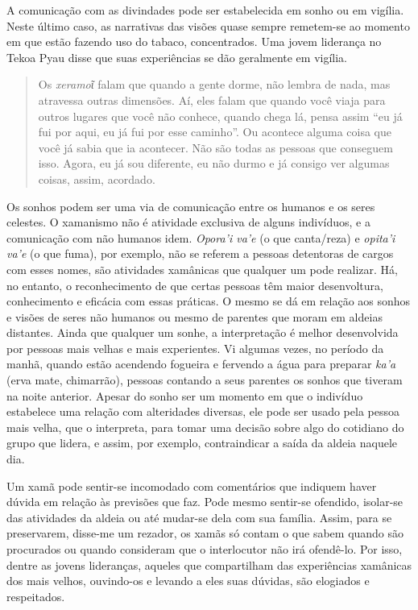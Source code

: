 A comunicação com as divindades pode ser estabelecida em sonho ou em
vigília. Neste último caso, as narrativas das visões quase sempre
remetem-se ao momento em que estão fazendo uso do tabaco, concentrados.
Uma jovem liderança no Tekoa Pyau disse que suas experiências se dão
geralmente em vigília.

\begin{quote}
Os \emph{xeramoῖ} falam que quando a gente dorme, não lembra de nada,
mas atravessa outras dimensões. Aí, eles falam que quando você viaja
para outros lugares que você não conhece, quando chega lá, pensa assim
``eu já fui por aqui, eu já fui por esse caminho''. Ou acontece alguma
coisa que você já sabia que ia acontecer. Não são todas as pessoas que
conseguem isso. Agora, eu já sou diferente, eu não durmo e já consigo
ver algumas coisas, assim, acordado.
\end{quote}

Os sonhos podem ser uma via de comunicação entre os humanos e os seres
celestes. O xamanismo não é atividade exclusiva de alguns indivíduos, e
a comunicação com não humanos idem. \emph{Opora'i va'e} (o que
canta/reza) e \emph{opita'i va'e} (o que fuma), por exemplo, não se
referem a pessoas detentoras de cargos com esses nomes, são atividades
xamânicas que qualquer um pode realizar. Há, no entanto, o
reconhecimento de que certas pessoas têm maior desenvoltura,
conhecimento e eficácia com essas práticas. O mesmo se dá em relação aos
sonhos e visões de seres não humanos ou mesmo de parentes que moram em
aldeias distantes. Ainda que qualquer um sonhe, a interpretação é melhor
desenvolvida por pessoas mais velhas e mais experientes. Vi algumas
vezes, no período da manhã, quando estão acendendo fogueira e fervendo a
água para preparar \emph{ka'a} (erva mate, chimarrão), pessoas contando
a seus parentes os sonhos que tiveram na noite anterior. Apesar do sonho
ser um momento em que o indivíduo estabelece uma relação com alteridades
diversas, ele pode ser usado pela pessoa mais velha, que o interpreta,
para tomar uma decisão sobre algo do cotidiano do grupo que lidera, e
assim, por exemplo, contraindicar a saída da aldeia naquele dia.

Um xamã pode sentir-se incomodado com comentários que indiquem haver
dúvida em relação às previsões que faz. Pode mesmo sentir-se ofendido,
isolar-se das atividades da aldeia ou até mudar-se dela com sua família.
Assim, para se preservarem, disse-me um rezador, os xamãs só contam o
que sabem quando são procurados ou quando consideram que o interlocutor
não irá ofendê-lo. Por isso, dentre as jovens lideranças, aqueles que
compartilham das experiências xamânicas dos mais velhos, ouvindo-os e
levando a eles suas dúvidas, são elogiados e respeitados.

